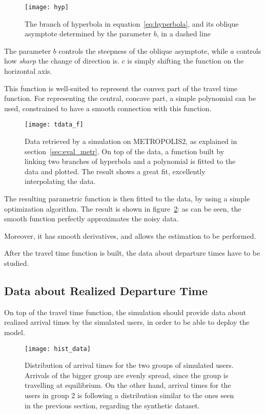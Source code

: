\begin{figure}
  \centering
  \texttt{[image: hyp]}
  \caption{The branch of hyperbola in equation~\eqref{eq:hyperbola},
  and its oblique asymptote determined by the parameter \(b\), in a dashed line}
  \label{fig:hyp}
\end{figure}

The parameter \(b\) controls the steepness of the oblique asymptote,
while \(a\) controls how \textit{sharp} the change of direction is.
\(c\) is simply shifting the function on the horizontal axis.

This function is well-suited to represent the convex part of the travel time function.
For representing the central, concave part, a simple polynomial can be used,
constrained to have a smooth connection with this function.

\begin{figure}
  \centering
  \texttt{[image: tdata\_f]}
  \caption{Data retrieved by a simulation on METROPOLIS2, as explained in section~\ref{sec:eval_metr}.
    On top of the data, a function built by linking two branches of hyperbola and a polynomial is fitted to the data and plotted.
  The result shows a great fit, excellently interpolating the data.}
  \label{fig:func_on_data}
\end{figure}

The resulting parametric function is then fitted to the data,
by using a simple optimization algorithm.
The result is shown in figure~\ref{fig:func_on_data}:
as can be seen, the smooth function perfectly approximates the noisy data.

Moreover, it has smooth derivatives, and allows the estimation to be performed.

After the travel time function is built, the data about departure times have to be studied.

\subsection{Data about Realized Departure Time}

On top of the travel time function,
the simulation should provide data about realized arrival times by the simulated users,
in order to be able to deploy the model.

\begin{figure}
  \centering
  \texttt{[image: hist\_data]}
  \caption{Distribution of arrival times for the two groups of simulated users.
    Arrivals of the bigger group are evenly spread, since the group is travelling at equilibrium.
  On the other hand, arrival times for the users in group 2 is following a distribution similar to the ones seen in the previous section, regarding the synthetic dataset.}
  \label{fig:hist_data}
\end{figure}

